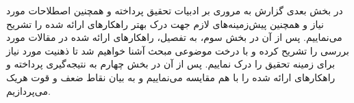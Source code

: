 در بخش بعدی گزارش به مروری بر ادبیات تحقیق پرداخته و همچنین اصطلاحات مورد نیاز و همچنین پیش‌زمینه‌های لازم جهت درک بهتر راهکارهای ارائه شده را تشریح می‌نماییم. پس از آن در بخش سوم، به تفصیل، راهکارهای ارائه شده در مقالات مورد بررسی را تشریح کرده و با درخت موضوعی مبحث آشنا خواهیم شد تا ذهنیت مورد نیاز برای زمینه تحقیق را درک نماییم. پس از آن در بخش چهارم به نتیجه‌گیری پرداخته و راهکارهای ارائه شده را با هم مقایسه می‌نماییم و به بیان نقاط ضعف و قوت هریک می‌پردازیم.












